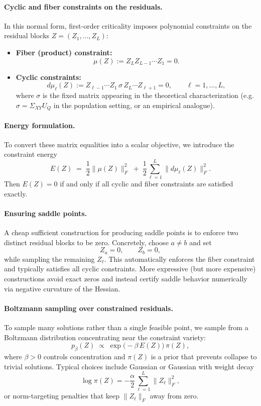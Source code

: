 \documentclass{article}
\theoremstyle{definition}
\begin{document}
\paragraph{Cyclic and fiber constraints on the residuals.}
In this normal form, first-order criticality imposes polynomial constraints on the residual blocks \(Z=(Z_1,\dots,Z_L)\):

\begin{itemize}
\item \textbf{Fiber (product) constraint:}
\[
\mu(Z) := Z_L Z_{L-1}\cdots Z_1 = 0.
\]

\item \textbf{Cyclic constraints:}
\[
d\mu_\ell(Z) := Z_{\ell-1}\cdots Z_1 \, \sigma \, Z_L\cdots Z_{\ell+1} = 0,
\qquad \ell=1,\dots,L,
\]
where \(\sigma\) is the fixed matrix appearing in the theoretical characterization (e.g. \(\sigma=\Sigma_{XY}U_Q\) in the population setting, or an empirical analogue).
\end{itemize}

\paragraph{Energy formulation.}
To convert these matrix equalities into a scalar objective, we introduce the constraint energy
\[
E(Z)
\;=\;
\frac{1}{2}\|\mu(Z)\|_F^2
\;+\;
\frac{1}{2}\sum_{\ell=1}^L \|d\mu_\ell(Z)\|_F^2.
\]
Then \(E(Z)=0\) if and only if all cyclic and fiber constraints are satisfied exactly.

\paragraph{Ensuring saddle points.}
A cheap sufficient construction for producing saddle points is to enforce two distinct residual blocks to be zero. Concretely, choose \(a\neq b\) and set
\[
Z_a=0,\qquad Z_b=0,
\]
while sampling the remaining \(Z_\ell\). This automatically enforces the fiber constraint and typically satisfies all cyclic constraints. More expressive (but more expensive) constructions avoid exact zeros and instead certify saddle behavior numerically via negative curvature of the Hessian.

\paragraph{Boltzmann sampling over constrained residuals.}
To sample many solutions rather than a single feasible point, we sample from a Boltzmann distribution concentrating near the constraint variety:
\[
p_\beta(Z) \;\propto\; \exp\big(-\beta\,E(Z)\big)\,\pi(Z),
\]
where \(\beta>0\) controls concentration and \(\pi(Z)\) is a prior that prevents collapse to trivial solutions. Typical choices include Gaussian or Gaussian with weight decay
\[
\log \pi(Z) = -\frac{\alpha}{2}\sum_{\ell=1}^L \|Z_\ell\|_F^2,
\]
or norm-targeting penalties that keep \(\|Z_\ell\|_F\) away from zero.
\end{document}
